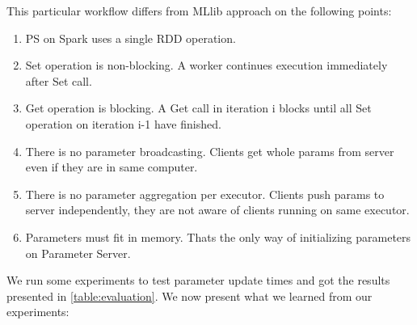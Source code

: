 This particular workflow differs from MLlib approach on the following points:
\begin{enumerate}
  \item PS on Spark uses a single RDD operation.
  \item Set operation is non-blocking. A worker continues execution immediately after Set call. 
  \item Get operation is blocking. A Get call in iteration i blocks until all Set operation on iteration i-1 have finished.
  \item There is no parameter broadcasting. Clients get whole params from server even if they are in same computer.
  \item There is no parameter aggregation per executor. Clients push params to server independently, they are not aware of clients running on same executor.
  \item Parameters must fit in memory. Thats the only way of initializing parameters on Parameter Server.
\end{enumerate}

We run some experiments to test parameter update times and got the results presented in \autoref{table:evaluation}. We now present what we learned from our experiments:

